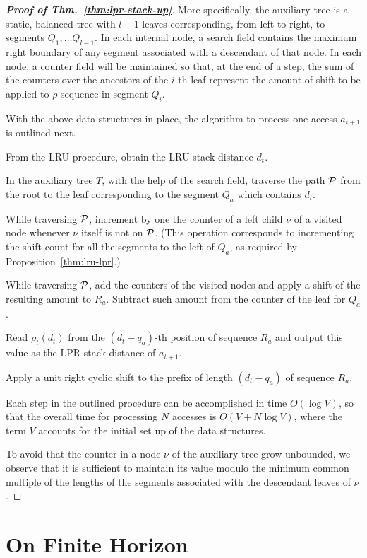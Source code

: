 \documentclass[11pt,a4paper]{article}
\theoremstyle{definition}
\theoremstyle{remark}
\begin{document}
\begin{proof}[{\bf Proof of Thm.~\ref{thm:lpr-stack-up}}]
More specifically, the auxiliary tree is a static, balanced tree with
$l-1$ leaves corresponding, from left to right, to segments $Q_1,
\ldots Q_{l-1}$. In each internal node, a search field contains the
maximum right boundary of any segment associated with a descendant of
that node. In each node, a counter field will be maintained so that,
at the end of a step, the sum of the counters over the ancestors of
the $i$-th leaf represent the amount of shift to be applied to
$\rho$-sequence in segment $Q_i$.

With the above data structures in place, the algorithm to process one
access $a_{t+1}$ is outlined next.
\begin{compactenum}
\item From the LRU procedure, obtain the LRU stack distance $d_t$.
\item In the auxiliary tree $T$, with the help of the search field, 
traverse the path $\cal P$ from the root to the leaf corresponding to
the segment $Q_a$ which contains $d_t$.
\item While traversing $\cal P$, increment by one the counter of a
left child $\nu$ of a visited node whenever $\nu$ itself is not on
${\cal P}$. (This operation corresponds to incrementing the shift
count for all the segments to the left of $Q_a$, as required by
Proposition~\ref{thm:lru-lpr}.)
\item While traversing $\cal P$, add the counters of the visited 
nodes and apply a shift of the resulting amount to $R_a$. Subtract such
amount from the counter of the leaf for $Q_a$.
\item Read $\rho_t(d_t)$ from the $(d_t-q_a)$-th position of sequence 
$R_a$ and output this value as the LPR stack distance of $a_{t+1}$.
\item Apply a unit right cyclic shift to the prefix of length $(d_t-q_a)$
of sequence $R_a$.
\end{compactenum}
Each step in the outlined procedure can be accomplished in time
$O(\log V)$, so that the overall time for processing $N$ accesses is
$O(V+N \log V)$, where the term $V$ accounts for the initial set up of
the data structures.

To avoid that the counter in a node $\nu$ of the auxiliary tree grow
unbounded, we observe that it is sufficient to maintain its value
modulo the minimum common multiple of the lengths of the segments
associated with the descendant leaves of $\nu$.
\end{proof}


\section{On Finite Horizon}
\label{sec:fh}
\end{document}
